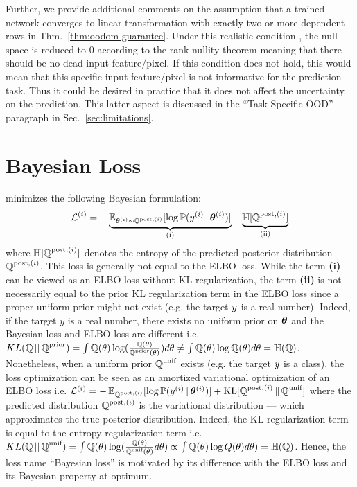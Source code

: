 Further, we provide additional comments on the assumption that a trained network converges to linear transformation with exactly two or more dependent rows in Thm.~\ref{thm:oodom-guarantee}. Under this realistic condition \cite{overconfident-relu}, the null space is reduced to $0$ according to the rank-nullity theorem meaning that there should be no dead input feature/pixel. If this condition does not hold, this would mean that this specific input feature/pixel is not informative for the prediction task. Thus it could be desired in practice that it does not affect the uncertainty on the prediction. This latter aspect is discussed in the “Task-Specific OOD” paragraph in Sec.~\ref{sec:limitations}.

\section{Bayesian Loss} 
\label{sec:loss}

\NatPNacro{} minimizes the following Bayesian formulation:
%
\begin{equation}
    \mathcal{L}^{(i)} = - \underbrace{\operatorname{\mathbb{E}}_{\bm{\theta}^{(i)} \sim \operatorname{\mathbb{Q}}^{\text{post},(i)}}[\log \mathbb{P}(y^{(i)}\,|\, \bm{\theta} ^{(i)})]}_\text{(i)} - \underbrace{\operatorname{\mathbb{H}}[\operatorname{\mathbb{Q}}^{\text{post},(i)}]}_\text{(ii)}
\end{equation}
%
where $\operatorname{\mathbb{H}}[\operatorname{\mathbb{Q}}^{\text{post},(i)}]$ denotes the entropy of the predicted posterior distribution $\operatorname{\mathbb{Q}}^{\text{post},(i)}$. This loss is generally not equal to the ELBO loss. While the term \textbf{(i)} can be viewed as an ELBO loss without KL regularization, the term \textbf{(ii)} is not necessarily equal to the prior KL regularization term in the ELBO loss since a proper uniform prior might not exist (e.g. the target $y$ is a real number). Indeed, if the target $y$ is a real number, there exists no uniform prior on $\bm{\theta}$ and the Bayesian loss and ELBO loss are different i.e. $KL(\operatorname{\mathbb{Q}}||\operatorname{\mathbb{Q}}^\text{prior}) = \int \operatorname{\mathbb{Q}}(\theta) \log (\frac{\operatorname{\mathbb{Q}}(\theta)}{\operatorname{\mathbb{Q}}^\text{prior}(\theta)}) d\theta \neq \int \operatorname{\mathbb{Q}}(\theta) \log \operatorname{\mathbb{Q}}(\theta) d\theta = \operatorname{\mathbb{H}}(\operatorname{\mathbb{Q}})$. Nonetheless, when a uniform prior $\operatorname{\mathbb{Q}}^\text{unif}$ exists (e.g. the target $y$ is a class), the loss optimization can be seen as an amortized variational optimization of an ELBO loss \citep{amortized-variational-inference} i.e. $\mathcal{L}^{(i)} = - \operatorname{\mathbb{E}}_{\operatorname{\mathbb{Q}}^{\text{post},(i)}}[\log \mathbb{P}(y^{(i)}\,|\, \bm{\theta} ^{(i)})] + \text{KL}[\operatorname{\mathbb{Q}}^{\text{post},(i)}\|\operatorname{\mathbb{Q}}^\text{unif}]$ where the predicted distribution $\operatorname{\mathbb{Q}}^{\text{post},(i)}$ is the variational distribution --- which approximates the true posterior distribution. Indeed, the KL regularization term is equal to the entropy regularization term i.e. $KL(\operatorname{\mathbb{Q}}||\operatorname{\mathbb{Q}}^\text{unif}) = \int \operatorname{\mathbb{Q}}(\theta) \log (\frac{\operatorname{\mathbb{Q}}(\theta)}{\operatorname{\mathbb{Q}}^\text{unif}(\theta)} d\theta) \propto \int \operatorname{\mathbb{Q}}(\theta) \log Q(\theta) d\theta) = \operatorname{\mathbb{H}}(\operatorname{\mathbb{Q}})$. Hence, the loss name ``Bayesian loss'' \citep{charpentier2020} is motivated by its difference with the ELBO loss and its Bayesian property at optimum.

